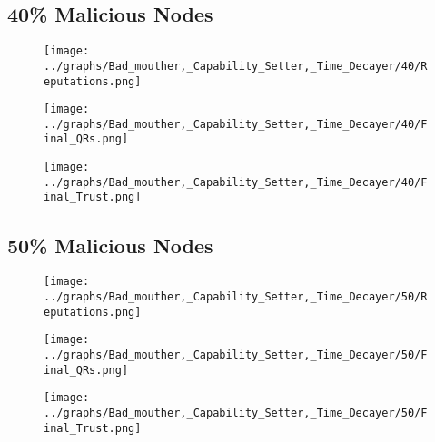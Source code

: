 \documentclass{article}
\begin{document}
  \begin{minipage}[t]{0.49\columnwidth}
    \subsection*{40\% Malicious Nodes}
        \begin{figure}[H]
            \centering
            \texttt{[image: ../graphs/Bad\_mouther,\_Capability\_Setter,\_Time\_Decayer/40/Reputations.png]}
        \end{figure}
        \begin{figure}[H]
            \centering
            \texttt{[image: ../graphs/Bad\_mouther,\_Capability\_Setter,\_Time\_Decayer/40/Final\_QRs.png]}
        \end{figure}
    \end{minipage}
    \begin{minipage}[t]{0.49\columnwidth}
        \begin{figure}[H]
            \centering
            \texttt{[image: ../graphs/Bad\_mouther,\_Capability\_Setter,\_Time\_Decayer/40/Final\_Trust.png]}
        \end{figure}
    \end{minipage}

  \begin{minipage}[t]{0.49\columnwidth}
    \subsection*{50\% Malicious Nodes}
        \begin{figure}[H]
            \centering
            \texttt{[image: ../graphs/Bad\_mouther,\_Capability\_Setter,\_Time\_Decayer/50/Reputations.png]}
        \end{figure}
        \begin{figure}[H]
            \centering
            \texttt{[image: ../graphs/Bad\_mouther,\_Capability\_Setter,\_Time\_Decayer/50/Final\_QRs.png]}
        \end{figure}
    \end{minipage}
    \begin{minipage}[t]{0.49\columnwidth}
        \begin{figure}[H]
            \centering
            \texttt{[image: ../graphs/Bad\_mouther,\_Capability\_Setter,\_Time\_Decayer/50/Final\_Trust.png]}
        \end{figure}
    \end{minipage}
\end{document}
